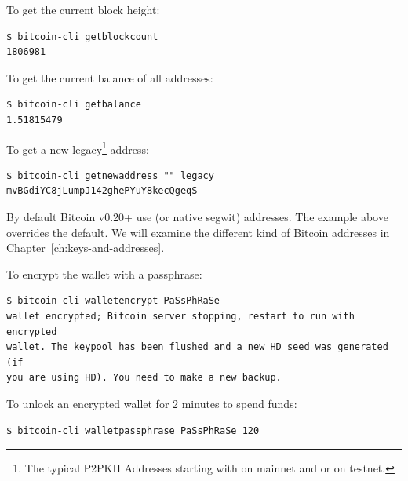 \noindent To get the current block height:
\begin{emphbox}
\begin{lstlisting}[style=Bash]
$ bitcoin-cli getblockcount
1806981
\end{lstlisting}
\end{emphbox}
\vspace{1em}

\noindent To get the current balance of all addresses:
\begin{emphbox}
\begin{lstlisting}[style=Bash]
$ bitcoin-cli getbalance
1.51815479
\end{lstlisting}
\end{emphbox}
\vspace{1em}

\noindent To get a new legacy\footnote{The typical P2PKH Addresses starting with  on mainnet and  or  on testnet.} address:
\begin{emphbox}
\begin{lstlisting}[style=Bash]
$ bitcoin-cli getnewaddress "" legacy
mvBGdiYC8jLumpJ142ghePYuY8kecQgeqS
\end{lstlisting}
\end{emphbox}
\noindent By default Bitcoin v0.20+ use  (or native segwit) addresses. The example above overrides the default. We will examine the different kind of Bitcoin addresses in Chapter~\ref{ch:keys-and-addresses}.
\vspace{1em}

\noindent To encrypt the wallet with a passphrase:
\begin{emphbox}
\begin{lstlisting}[style=Bash]
$ bitcoin-cli walletencrypt PaSsPhRaSe
wallet encrypted; Bitcoin server stopping, restart to run with encrypted 
wallet. The keypool has been flushed and a new HD seed was generated (if 
you are using HD). You need to make a new backup.
\end{lstlisting}
\end{emphbox}
\vspace{1em}

\noindent To unlock an encrypted wallet for 2 minutes to spend funds:
\begin{emphbox}
\begin{lstlisting}[style=Bash]
$ bitcoin-cli walletpassphrase PaSsPhRaSe 120
\end{lstlisting}
\end{emphbox}
\vspace{1em}

